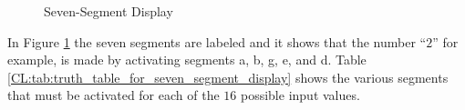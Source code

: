\begin{figure}[H]
  \caption{Seven-Segment Display}
  \label{CL:fig:seven_segment_display}  
  \myfloatalign
\end{figure}
 

In Figure \ref{CL:fig:seven_segment_display} the seven segments are labeled and it shows that the number ``$ 2 $'' for example, is made by activating segments \textsf{a}, \textsf{b}, \textsf{g}, \textsf{e}, and \textsf{d}. Table \ref{CL:tab:truth_table_for_seven_segment_display} shows the various segments that must be activated for each of the $ 16 $ possible input values.

